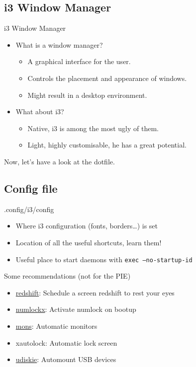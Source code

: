 \documentclass{beamer}
\begin{document}
\subsection*{i3 Window Manager}
\begin{frame}{i3 Window Manager}
  \begin{itemize}
    \item What is a window manager?
      \begin{itemize}
        \item A graphical interface for the user.
        \item Controls the placement and appearance of windows.
        \item Might result in a desktop environment.
      \end{itemize}
    \item What about i3?
      \begin{itemize}
        \item Native, i3 is among the most ugly of them.
        \item Light, highly customisable, he has a great potential.
      \end{itemize}
  \end{itemize}
  Now, let's have a look at the dotfile.
\end{frame}

\subsection*{Config file}
\begin{frame}{.config/i3/config}
  \begin{itemize}
  \item Where i3 configuration (fonts, borders\dots) is set
  \item Location of all the useful shortcuts, learn them!
  \item Useful place to start daemons with \texttt{exec --no-startup-id}
  \end{itemize}
\end{frame}

\begin{frame}{Some recommendations (not for the PIE)}
  \begin{itemize}
    \item \href{https://wiki.archlinux.org/index.php/Redshift}{redshift}: Schedule a screen redshift to rest your eyes
    \item \href{https://wiki.archlinux.org/index.php/Activating_Numlock_on_Bootup}{numlockx}: Activate numlock on bootup
    \item \href{https://aur.archlinux.org/mons.git}{mons}: Automatic monitors
    \item xautolock: Automatic lock screen
    \item \href{https://wiki.archlinux.org/index.php/Udisks}{udiskie}: Automount USB devices
  \end{itemize}
\end{frame}
\end{document}

